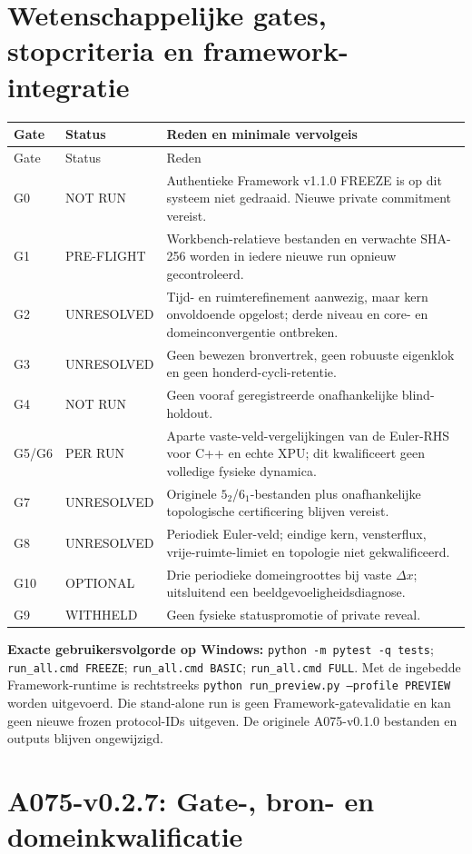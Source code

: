 \documentclass[10pt,a4paper]{article}
\begin{document}
\section{Wetenschappelijke gates, stopcriteria en framework-integratie}
\begin{longtable}{@{}p{12mm}p{25mm}p{109mm}@{}}\toprule
Gate & Status & Reden en minimale vervolgeis\\\midrule\endfirsthead\toprule Gate & Status & Reden\\\midrule\endhead
G0 & NOT RUN & Authentieke Framework v1.1.0 FREEZE is op dit systeem niet gedraaid. Nieuwe private commitment vereist.\\
G1 & PRE-FLIGHT & Workbench-relatieve bestanden en verwachte SHA-256 worden in iedere nieuwe run opnieuw gecontroleerd.\\
G2 & UNRESOLVED & Tijd- en ruimterefinement aanwezig, maar kern onvoldoende opgelost; derde niveau en core- en domeinconvergentie ontbreken.\\
G3 & UNRESOLVED & Geen bewezen bronvertrek, geen robuuste eigenklok en geen honderd-cycli-retentie.\\
G4 & NOT RUN & Geen vooraf geregistreerde onafhankelijke blind-holdout.\\
G5/G6 & PER RUN & Aparte vaste-veld-vergelijkingen van de Euler-RHS voor C++ en echte XPU; dit kwalificeert geen volledige fysieke dynamica.\\
G7 & UNRESOLVED & Originele $5_2$/$6_1$-bestanden plus onafhankelijke topologische certificering blijven vereist.\\
G8 & UNRESOLVED & Periodiek Euler-veld; eindige kern, vensterflux, vrije-ruimte-limiet en topologie niet gekwalificeerd.\\
G10 & OPTIONAL & Drie periodieke domeingroottes bij vaste $\Delta x$; uitsluitend een beeldgevoeligheidsdiagnose.\\
G9 & WITHHELD & Geen fysieke statuspromotie of private reveal.\\\bottomrule\end{longtable}
\noindent\textbf{Exacte gebruikersvolgorde op Windows:} \texttt{python -m pytest -q tests}; \texttt{run\_all.cmd FREEZE}; \texttt{run\_all.cmd BASIC}; \texttt{run\_all.cmd FULL}. Met de ingebedde Framework-runtime is rechtstreeks \texttt{python run\_preview.py --profile PREVIEW} worden uitgevoerd. Die stand-alone run is geen Framework-gatevalidatie en kan geen nieuwe frozen protocol-IDs uitgeven. De originele A075-v0.1.0 bestanden en outputs blijven ongewijzigd.
\section{A075-v0.2.7: Gate-, bron- en domeinkwalificatie}
\end{document}
